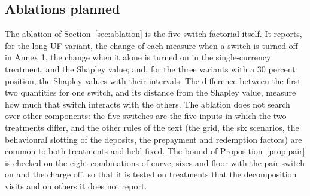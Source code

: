 \subsection{Ablations planned}
\label{sec:design-ablation}

The ablation of Section~\ref{sec:ablation} is the five-switch factorial itself. It reports, for the long UF variant, the change of each measure when a switch is turned off in Annex 1, the change when it alone is turned on in the single-currency treatment, and the Shapley value; and, for the three variants with a 30 percent position, the Shapley values with their intervals. The difference between the first two quantities for one switch, and its distance from the Shapley value, measure how much that switch interacts with the others. The ablation does not search over other components: the five switches are the five inputs in which the two treatments differ, and the other rules of the text (the grid, the six scenarios, the behavioural slotting of the deposits, the prepayment and redemption factors) are common to both treatments and held fixed. The bound of Proposition~\ref{prop:pair} is checked on the eight combinations of curve, sizes and floor with the pair switch on and the charge off, so that it is tested on treatments that the decomposition visits and on others it does not report.
